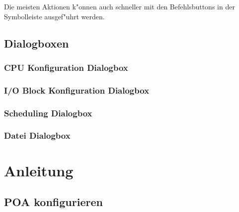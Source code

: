 \documentclass[a4paper,titlepage,12pt,ngerman]{scrbook}
\begin{document}
Die meisten Aktionen k"onnen auch schneller mit den Befehlsbuttons in der Symbolleiste ausgef"uhrt werden.
	
\section{Dialogboxen}

\subsection{CPU Konfiguration Dialogbox}
\subsection{I/O Block Konfiguration Dialogbox}
\subsection{Scheduling Dialogbox}
\subsection{Datei Dialogbox}


\chapter{Anleitung}


\section{POA konfigurieren}
\end{document}
